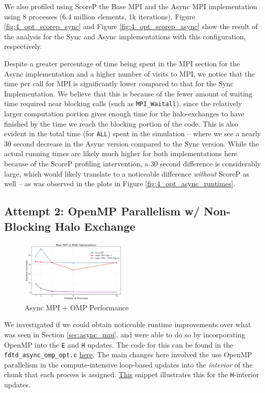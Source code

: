\documentclass[a4paper,10pt]{article}
\begin{document}
\begin{multicols}{2}
We also profiled using ScoreP the Base MPI and the Async MPI implementation using 8 processes (6.4 million elements, 1k iterations). Figure \ref{fig:4_opt_scorep_sync} and Figure \ref{fig:4_opt_scorep_async} show the result of the analysis for the Sync and Async implementations with this configuration, respectively.  

Despite a greater percentage of time being spent in the MPI section for the Async implementation and a higher number of visits to MPI, we notice that the time per call for MPI is significantly lower compared to that for the Sync Implementation. We believe that this is because of the fewer amount of waiting time required near blocking calls (such as \verb|MPI_Waitall|), since the relatively larger computation portion gives enough time for the halo-exchanges to have finished by the time we reach the blocking portion of the code. This is also evident in the total time (for \verb|ALL|) spent in the simulation -- where we see a nearly 30 second decrease in the Async version compared to the Sync version. While the actual running times are likely much higher for both implementations here because of the ScoreP profiling intervention, a 30 second difference is considerably large, which would likely translate to a noticeable difference \textit{without} ScoreP as well -- as was observed in the plots in Figure \ref{fig:4_opt_async_runtimes}.

\subsection{Attempt 2: OpenMP Parallelism w/ Non-Blocking Halo Exchange}
\begin{figure}[H]
  \centering
  \includegraphics[width=0.45\textwidth]{../images/4_opt/opt_all.png}
  \caption{Async MPI + OMP Performance}
   \label{fig:4_opt_all}
\end{figure}

We investigated if we could obtain noticeable runtime improvements over what was seen in Section \ref{sec:async_mpi}, and were able to do so by incorporating OpenMP into the \verb|E| and \verb|H| updates. The code for this can be found in the \verb|fdtd_async_omp_opt.c| \href{https://github.com/paulmyr/DD2356-MethodsHPC/blob/master/5_project/4_opt/fdtd_async_omp_opt.c}{here}. The main changes here involved the use OpenMP parallelism in the compute-intensive loop-based updates into the \textit{interior} of the chunk that each process is assigned. \href{https://github.com/paulmyr/DD2356-MethodsHPC/blob/master/5_project/4_opt/fdtd_async_omp_opt.c#L61}{This} snippet illustrates this for the \verb|H|-interior updates. 


\end{multicols}
\end{document}
